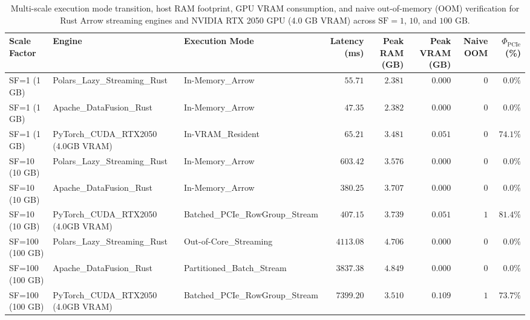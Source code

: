 \begin{table}[htbp]
\centering
\scriptsize
\setlength{\tabcolsep}{4.2pt}
\caption{Multi-scale execution mode transition, host RAM footprint, GPU VRAM consumption, and naive out-of-memory (OOM) verification for Rust Arrow streaming engines and NVIDIA RTX 2050 GPU (4.0 GB VRAM) across $\text{SF}=1$, $10$, and $100$ GB.}
\label{tab:multiscale_gpu_arrow}
\begin{tabular}{@{}lllrrrrr@{}}
\toprule
\textbf{Scale Factor} & \textbf{Engine} & \textbf{Execution Mode} & \textbf{Latency (ms)} & \textbf{Peak RAM (GB)} & \textbf{Peak VRAM (GB)} & \textbf{Naive OOM} & \textbf{$\Phi_{\text{PCIe}}$ (\%)} \\
\midrule
SF=1 (1 GB) & Polars\_Lazy\_Streaming\_Rust & In-Memory\_Arrow & $55.71$ & $2.381$ & $0.000$ & $0$ & $0.0\%$ \\
SF=1 (1 GB) & Apache\_DataFusion\_Rust & In-Memory\_Arrow & $47.35$ & $2.382$ & $0.000$ & $0$ & $0.0\%$ \\
SF=1 (1 GB) & PyTorch\_CUDA\_RTX2050 (4.0GB VRAM) & In-VRAM\_Resident & $65.21$ & $3.481$ & $0.051$ & $0$ & $74.1\%$ \\
SF=10 (10 GB) & Polars\_Lazy\_Streaming\_Rust & In-Memory\_Arrow & $603.42$ & $3.576$ & $0.000$ & $0$ & $0.0\%$ \\
SF=10 (10 GB) & Apache\_DataFusion\_Rust & In-Memory\_Arrow & $380.25$ & $3.707$ & $0.000$ & $0$ & $0.0\%$ \\
SF=10 (10 GB) & PyTorch\_CUDA\_RTX2050 (4.0GB VRAM) & Batched\_PCIe\_RowGroup\_Stream & $407.15$ & $3.739$ & $0.051$ & $1$ & $81.4\%$ \\
SF=100 (100 GB) & Polars\_Lazy\_Streaming\_Rust & Out-of-Core\_Streaming & $4113.08$ & $4.706$ & $0.000$ & $0$ & $0.0\%$ \\
SF=100 (100 GB) & Apache\_DataFusion\_Rust & Partitioned\_Batch\_Stream & $3837.38$ & $4.849$ & $0.000$ & $0$ & $0.0\%$ \\
SF=100 (100 GB) & PyTorch\_CUDA\_RTX2050 (4.0GB VRAM) & Batched\_PCIe\_RowGroup\_Stream & $7399.20$ & $3.510$ & $0.109$ & $1$ & $73.7\%$ \\
\bottomrule
\end{tabular}
\end{table}